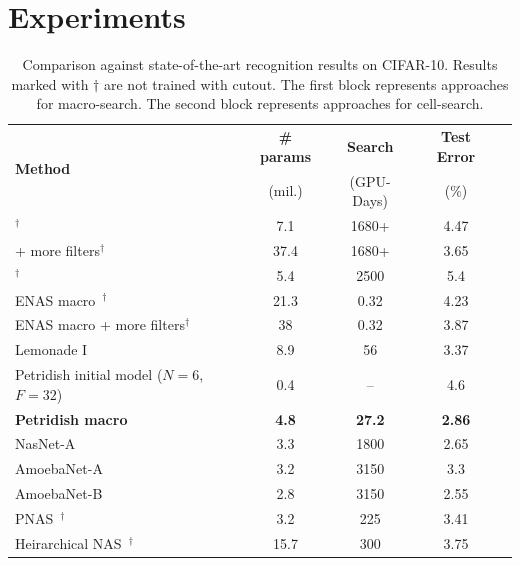 \documentclass{article}
\newcommand{\Petridish}{Petridish\xspace}
\begin{document}
\section{Experiments}
\label{sec:experiment}
\vspace{-3pt}
\begin{table}[t]
    \centering
    \caption{Comparison against state-of-the-art recognition results on CIFAR-10. Results marked with $\dagger$ are not trained with cutout. The first block represents approaches for macro-search. The second block represents approaches for cell-search. 
    }
    \begin{tabular}{l|cccc}
    \hline
\multirow{ 2}{*}{\textbf{Method} }
        &  \textbf{\# params} 
        &  \textbf{Search } 
        &  \textbf{Test Error } \\
        &  (mil.)
        &  (GPU-Days)
        &  (\%)\\
\hline
\citet{NAS}$^{\dagger}$
    &  7.1 &  1680+ &  4.47  \\
\citet{NAS} + more filters$^{\dagger}$
    &  37.4 &   1680+ &  3.65   \\
\citet{Real2017EvoNet}$^{\dagger}$
    &  5.4 &   2500 &  5.4  \\
ENAS macro~\citep{Pham2018EfficientNA}$^{\dagger}$
    &  21.3 &  0.32 &  4.23 \\
ENAS macro + more filters$^{\dagger}$
    &  38 &   0.32 &  3.87 \\
Lemonade I~\citep{Elsken2018EfficientMN}
    &  8.9 &    56 &  3.37 \\
\hline
\Petridish initial model ($N=6$, $F=32$)
    & 0.4 &  -- & 4.6 \\
\textbf{\Petridish macro} 
    & \textbf{4.8} & \textbf{27.2} & \textbf{2.86} \\
\hline \hline
NasNet-A~\citep{NASCell}
    &  3.3 &    1800 &  2.65   \\
AmoebaNet-A~\citep{Real2018RegularizedEF}
    &  3.2 &  3150 &  3.3  \\
AmoebaNet-B~\citep{Real2018RegularizedEF} 
    &  2.8 &   3150 &  2.55 \\ 
PNAS~\citep{Liu2017ProgressiveNA}$^{\dagger}$
    &  3.2 &  225 &  3.41 \\
Heirarchical NAS~\citep{Liu2018HierNA}$^{\dagger}$
    &  15.7 &    300 &  3.75 \\ 

\end{tabular}
\end{table}
\end{document}
